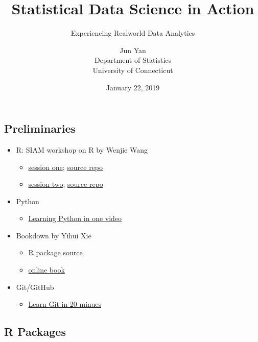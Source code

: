 \documentclass[]{article}
\title{Statistical Data Science in Action}
\subtitle{Experiencing Realworld Data Analytics}
\author{Jun Yan\\
Department of Statistics\\
University of Connecticut}
\date{January 22, 2019}
\providecommand{\tightlist}{%
  \setlength{\itemsep}{0pt}\setlength{\parskip}{0pt}}
\begin{document}
\maketitle

\subsection{Preliminaries}\label{preliminaries}

\begin{itemize}
\tightlist
\item
  R: SIAM workshop on R by Wenjie Wang

  \begin{itemize}
  \tightlist
  \item
    \href{https://wenjie-stat.me/2018-01-19-siam/}{session one};
    \href{https://github.com/wenjie2wang/2018-01-19-siam/}{source repo}
  \item
    \href{https://wenjie-stat.me/2018-04-06-siam/}{session two};
    \href{https://github.com/wenjie2wang/2018-04-06-siam/}{source repo}
  \end{itemize}
\item
  Python

  \begin{itemize}
  \tightlist
  \item
    \href{https://www.youtube.com/watch?v=N4mEzFDjqtA}{Learning Python
    in one video}
  \end{itemize}
\item
  Bookdown by Yihui Xie

  \begin{itemize}
  \tightlist
  \item
    \href{https://github.com/rstudio/bookdown}{R package source}
  \item
    \href{https://bookdown.org/yihui/bookdown/}{online book}
  \end{itemize}
\item
  Git/GitHub

  \begin{itemize}
  \tightlist
  \item
    \href{https://www.youtube.com/watch?v=Y9XZQO1n_7c}{Learn Git in 20
    minues}
  \end{itemize}
\end{itemize}

\subsection{R Packages}\label{r-packages}
\end{document}
